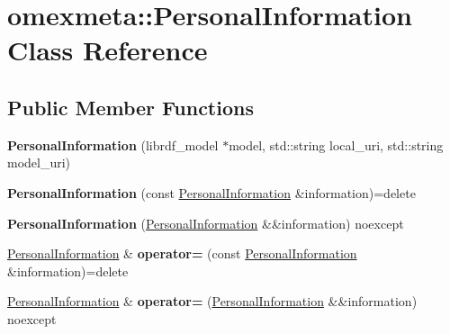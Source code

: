 \hypertarget{classomexmeta_1_1PersonalInformation}{}\section{omexmeta\+:\+:Personal\+Information Class Reference}
\label{classomexmeta_1_1PersonalInformation}
\subsection*{Public Member Functions}
\begin{DoxyCompactItemize}
\item 
\mbox{\label{classomexmeta_1_1PersonalInformation_aaba6661088be1ee005d367d438fcd275}} 
{\bfseries Personal\+Information} (librdf\+\_\+model $\ast$model, std\+::string local\+\_\+uri, std\+::string model\+\_\+uri)
\item 
\mbox{\label{classomexmeta_1_1PersonalInformation_a75cedb2a97efb996852b4e7cd39d6440}} 
{\bfseries Personal\+Information} (const \hyperlink{classomexmeta_1_1PersonalInformation}{Personal\+Information} \&information)=delete
\item 
\mbox{\label{classomexmeta_1_1PersonalInformation_a6653d6c5751154f5f33562d9879d6727}} 
{\bfseries Personal\+Information} (\hyperlink{classomexmeta_1_1PersonalInformation}{Personal\+Information} \&\&information) noexcept
\item 
\mbox{\label{classomexmeta_1_1PersonalInformation_a11a759dd5f065ba6a48f0bc3b4c48438}} 
\hyperlink{classomexmeta_1_1PersonalInformation}{Personal\+Information} \& {\bfseries operator=} (const \hyperlink{classomexmeta_1_1PersonalInformation}{Personal\+Information} \&information)=delete
\item 
\mbox{\label{classomexmeta_1_1PersonalInformation_a048a3377b27d4b87681e4f8c24dd8c4f}} 
\hyperlink{classomexmeta_1_1PersonalInformation}{Personal\+Information} \& {\bfseries operator=} (\hyperlink{classomexmeta_1_1PersonalInformation}{Personal\+Information} \&\&information) noexcept
\item 
\mbox{\label{classomexmeta_1_1PersonalInformation_aef8b8cfd83f8247b487d58f887c93e54}} 

\end{DoxyCompactItemize}
